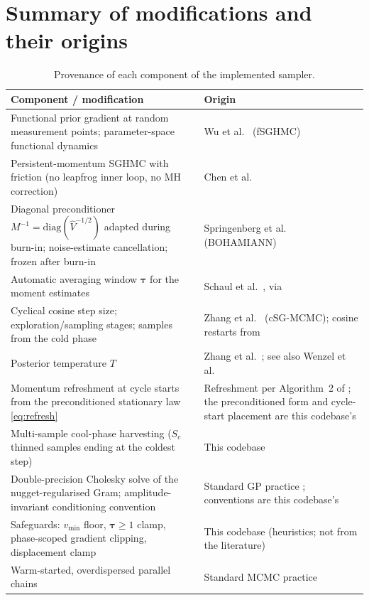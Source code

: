 \documentclass[11pt]{article}
\newcommand{\btau}{\bm{\tau}}
\begin{document}
\section{Summary of modifications and their origins}

\begin{table}[h]
\centering
\small
\begin{tabular}{p{} p{}}
\toprule
\textbf{Component / modification} & \textbf{Origin} \\
\midrule
Functional prior gradient at random measurement points; parameter-space
functional dynamics & Wu et al.~\cite{wu2025} (fSGHMC) \\
\addlinespace
Persistent-momentum SGHMC with friction (no leapfrog inner loop, no MH
correction) & Chen et al.~\cite{chen2014} \\
\addlinespace
Diagonal preconditioner $M^{-1} = \mathrm{diag}(\hat V^{-1/2})$ adapted
during burn-in; noise-estimate cancellation; frozen after burn-in &
Springenberg et al.~\cite{springenberg2016} (BOHAMIANN) \\
\addlinespace
Automatic averaging window $\btau$ for the moment estimates &
Schaul et al.~\cite{schaul2013}, via \cite{springenberg2016} \\
\addlinespace
Cyclical cosine step size; exploration/sampling stages; samples from the cold
phase & Zhang et al.~\cite{zhang2020} (cSG-MCMC); cosine restarts from
\cite{loshchilov2017} \\
\addlinespace
Posterior temperature $T$ & Zhang et al.~\cite{zhang2020}; see also Wenzel et
al.~\cite{wenzel2020} \\
\addlinespace
Momentum refreshment at cycle starts from the preconditioned stationary law
\eqref{eq:refresh} & Refreshment per Algorithm~2 of \cite{wu2025}; the
preconditioned form and cycle-start placement are this codebase's \\
\addlinespace
Multi-sample cool-phase harvesting ($S_c$ thinned samples ending at the
coldest step) & This codebase \\
\addlinespace
Double-precision Cholesky solve of the nugget-regularised Gram;
amplitude-invariant conditioning convention & Standard GP practice
\cite{rasmussen2006}; conventions are this codebase's \\
\addlinespace
Safeguards: $v_{\min}$ floor, $\btau\ge1$ clamp, phase-scoped gradient
clipping, displacement clamp & This codebase (heuristics; not from the
literature) \\
\addlinespace
Warm-started, overdispersed parallel chains & Standard MCMC practice
\cite{gelman1992} \\
\bottomrule
\end{tabular}
\caption{Provenance of each component of the implemented sampler.}
\label{tab:origins}
\end{table}
\end{document}
